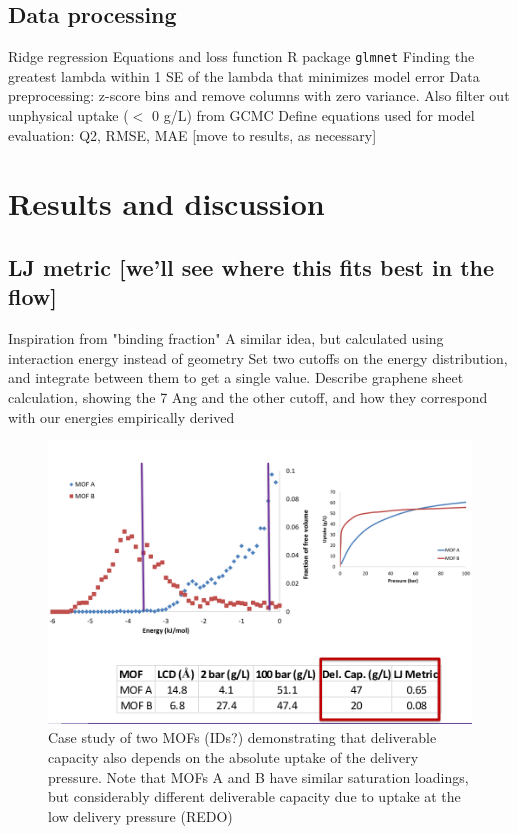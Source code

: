 \documentclass[letterpaper]{article}
\begin{document}
\subsection{Data processing}

\begin{outline}
	\1 Ridge regression
		\2 Equations and loss function
		\2 R package \verb|glmnet|
			\3 Finding the greatest lambda within 1 SE of the lambda that minimizes model error
	\1 Data preprocessing: z-score bins and remove columns with zero variance.  Also filter out unphysical uptake ($<$ 0 g/L) from GCMC
	\1 Define equations used for model evaluation: Q2, RMSE, MAE [move to results, as necessary]
\end{outline}



\section{Results and discussion}

\subsection{LJ metric [we'll see where this fits best in the flow]}

\begin{outline}
	\1 Inspiration from "binding fraction"
		\2 A similar idea, but calculated using interaction energy instead of geometry
		\2 Set two cutoffs on the energy distribution, and integrate between them to get a single value.
	\1 Describe graphene sheet calculation, showing the 7 Ang and the other cutoff, and how they correspond with our energies empirically derived
\end{outline}

\begin{figure}[H]
	\centering
	\includegraphics[width=0.75\columnwidth]{Figs/binding_case_study.png}
	\caption{Case study of two MOFs (IDs?) demonstrating that deliverable capacity also depends on the absolute uptake of the delivery pressure.  Note that MOFs A and B have similar saturation loadings, but considerably different deliverable capacity due to uptake at the low delivery pressure (REDO)}
	\label{fig:binding_cases}
\end{figure}
\end{document}
